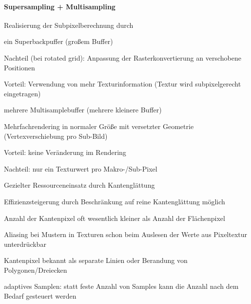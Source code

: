 \documentclass[landscape]{article}
\begin{document}
\begin{multicols}{3}
  \paragraph{Supersampling + Multisampling}
  \begin{itemize*}
    \item Realisierung der Subpixelberechnung durch
    \item ein Superbackpuffer (großem Buffer)
    \begin{itemize*}
      \item Nachteil (bei rotated grid): Anpassung der Rasterkonvertierung an verschobene Positionen
      \item Vorteil: Verwendung von mehr Texturinformation (Textur wird subpixelgerecht eingetragen)
    \end{itemize*}
    \item mehrere Multisamplebuffer (mehrere kleinere Buffer)
    \begin{itemize*}
      \item Mehrfachrendering in normaler Größe mit versetzter Geometrie (Vertexverschiebung pro Sub-Bild)
      \item Vorteil: keine Veränderung im Rendering
      \item Nachteil: nur ein Texturwert pro Makro-/Sub-Pixel
    \end{itemize*}
    \item Gezielter Ressourceneinsatz durch Kantenglättung
    \begin{itemize*} 
      \item Effizienzsteigerung durch Beschränkung auf reine Kantenglättung möglich
      \item Anzahl der Kantenpixel oft wesentlich kleiner als Anzahl der Flächenpixel
      \item Aliasing bei Mustern in Texturen schon beim Auslesen der Werte aus Pixeltextur unterdrückbar
      \item Kantenpixel bekannt als separate Linien oder Berandung von Polygonen/Dreiecken
    \end{itemize*}
    \item adaptives Samplen: statt feste Anzahl von Samples kann die Anzahl nach dem Bedarf gesteuert werden
  \end{itemize*}
  

\end{multicols}
\end{document}
